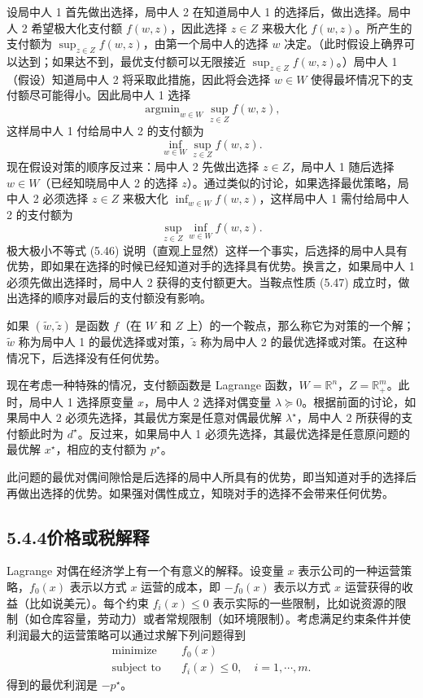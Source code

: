\documentclass[UTF8, 12pt, fontset=fandol, oneside]{ctexart}
\begin{document}
设局中人 1 首先做出选择，局中人 2 在知道局中人 1 的选择后，做出选择。局中人 2 希望极大化支付额 $f(w,z)$，因此选择 $z\in Z$ 来极大化 $f(w,z)$。所产生的支付额为 $\sup_{z\in Z} f(w,z)$，由第一个局中人的选择 $w$ 决定。（此时假设上确界可以达到；如果达不到，最优支付额可以无限接近 $\sup_{z\in Z} f(w,z)$。）局中人 1（假设）知道局中人 2 将采取此措施，因此将会选择 $w\in W$ 使得最坏情况下的支付额尽可能得小。因此局中人 1 选择
\[
\mathop{\mathrm{argmin}}_{w\in W}\sup_{z\in Z} f(w,z),
\]
这样局中人 1 付给局中人 2 的支付额为
\[
\inf_{w\in W}\sup_{z\in Z} f(w,z).
\]
现在假设对策的顺序反过来：局中人 2 先做出选择 $z\in Z$，局中人 1 随后选择 $w\in W$（已经知晓局中人 2 的选择 $z$）。通过类似的讨论，如果选择最优策略，局中人 2 必须选择 $z\in Z$ 来极大化 $\inf_{w\in W}f(w,z)$，这样局中人 1 需付给局中人 2 的支付额为
\[
\sup_{z\in Z}\inf_{w\in W} f(w,z).
\]
极大极小不等式 (5.46) 说明（直观上显然）这样一个事实，后选择的局中人具有优势，即如果在选择的时候已经知道对手的选择具有优势。换言之，如果局中人 1 必须先做出选择时，局中人 2 获得的支付额更大。当鞍点性质 (5.47) 成立时，做出选择的顺序对最后的支付额没有影响。

如果 $(\tilde{w},\tilde{z})$ 是函数 $f$（在 $W$ 和 $Z$ 上）的一个鞍点，那么称它为对策的一个解；$\tilde{w}$ 称为局中人 1 的最优选择或对策，$\tilde{z}$ 称为局中人 2 的最优选择或对策。在这种情况下，后选择没有任何优势。

现在考虑一种特殊的情况，支付额函数是 Lagrange 函数，$W=\mathbb{R}^n$，$Z=\mathbb{R}_+^m$。此时，局中人 1 选择原变量 $x$，局中人 2 选择对偶变量 $\lambda\succeq 0$。根据前面的讨论，如果局中人 2 必须先选择，其最优方案是任意对偶最优解 $\lambda^\star$，局中人 2 所获得的支付额此时为 $d^\star$。反过来，如果局中人 1 必须先选择，其最优选择是任意原问题的最优解 $x^\star$，相应的支付额为 $p^\star$。

此问题的最优对偶间隙恰是后选择的局中人所具有的优势，即当知道对手的选择后再做出选择的优势。如果强对偶性成立，知晓对手的选择不会带来任何优势。

\subsection*{5.4.4\quad 价格或税解释}

Lagrange 对偶在经济学上有一个有意义的解释。设变量 $x$ 表示公司的一种运营策略，$f_0(x)$ 表示以方式 $x$ 运营的成本，即 $-f_0(x)$ 表示以方式 $x$ 运营获得的收益（比如说美元）。每个约束 $f_i(x)\leq 0$ 表示实际的一些限制，比如说资源的限制（如仓库容量，劳动力）或者常规限制（如环境限制）。考虑满足约束条件并使利润最大的运营策略可以通过求解下列问题得到
\[
\begin{aligned}
\text{minimize}\quad & f_0(x)\\
\text{subject to}\quad & f_i(x)\leq 0,\quad i=1,\cdots,m.
\end{aligned}
\]
得到的最优利润是 $-p^\star$。
\end{document}
